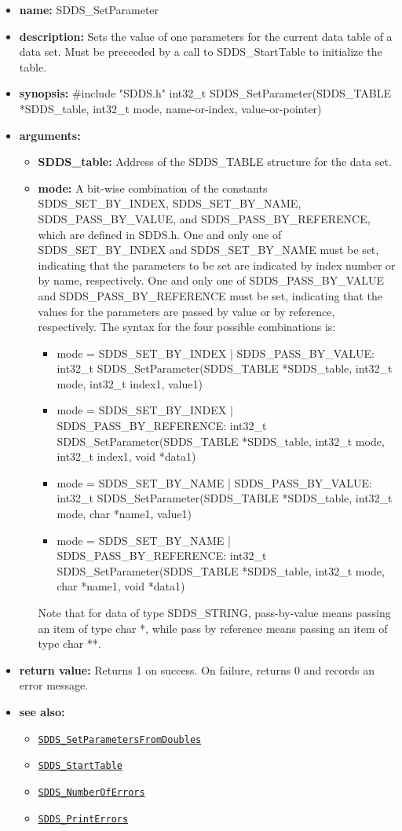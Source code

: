 \documentclass[11pt]{article}
\newcommand{\progref}[1]{\hyperref[SDDS_#1]{\tt SDDS\_#1}}
\begin{document}
\begin{itemize}
\item {\bf name:}\newline
SDDS\_SetParameter
\item {\bf description:}\newline
Sets the value of one parameters for the current data table of a data set. Must be preceeded by a call to SDDS\_StartTable to initialize the table.
\item {\bf synopsis:} \#include "SDDS.h"\newline
int32\_t SDDS\_SetParameter(SDDS\_TABLE *SDDS\_table, int32\_t mode,  name-or-index,  value-or-pointer)
\item {\bf arguments:}
\begin{itemize}
\item {\bf SDDS\_table:} Address of the SDDS\_TABLE structure for the data set.
\item {\bf mode:} A bit-wise combination of the constants SDDS\_SET\_BY\_INDEX, SDDS\_SET\_BY\_NAME, SDDS\_PASS\_BY\_VALUE, and SDDS\_PASS\_BY\_REFERENCE, which are defined in  SDDS.h. One and only one of SDDS\_SET\_BY\_INDEX and SDDS\_SET\_BY\_NAME must be set, indicating that the parameters to be set are indicated by index number or by name, respectively. One and only one of SDDS\_PASS\_BY\_VALUE and SDDS\_PASS\_BY\_REFERENCE must be set, indicating that the values for the parameters are passed by value or by reference, respectively. The syntax for the four possible combinations is:
\begin{itemize}
\item mode = SDDS\_SET\_BY\_INDEX | SDDS\_PASS\_BY\_VALUE: int32\_t SDDS\_SetParameter(SDDS\_TABLE *SDDS\_table, int32\_t mode, int32\_t index1,  value1)
\item mode = SDDS\_SET\_BY\_INDEX | SDDS\_PASS\_BY\_REFERENCE: int32\_t SDDS\_SetParameter(SDDS\_TABLE *SDDS\_table, int32\_t mode, int32\_t index1, void *data1)
\item mode = SDDS\_SET\_BY\_NAME | SDDS\_PASS\_BY\_VALUE: int32\_t SDDS\_SetParameter(SDDS\_TABLE *SDDS\_table, int32\_t mode, char *name1,  value1)
\item mode = SDDS\_SET\_BY\_NAME | SDDS\_PASS\_BY\_REFERENCE: int32\_t SDDS\_SetParameter(SDDS\_TABLE *SDDS\_table, int32\_t mode, char *name1, void *data1)  
\end{itemize}
Note that for data of type SDDS\_STRING, pass-by-value means passing an item of type char *, while pass by reference means passing an item of type char **.
\end{itemize}
\item {\bf return value:}\newline
Returns 1 on success. On failure, returns 0 and records an error message.
\item {\bf see also:}
\begin{itemize}
\item \progref{SetParametersFromDoubles}
\item \progref{StartTable}
\item \progref{NumberOfErrors}
\item \progref{PrintErrors}
\end{itemize}
\end{itemize}
\end{document}
